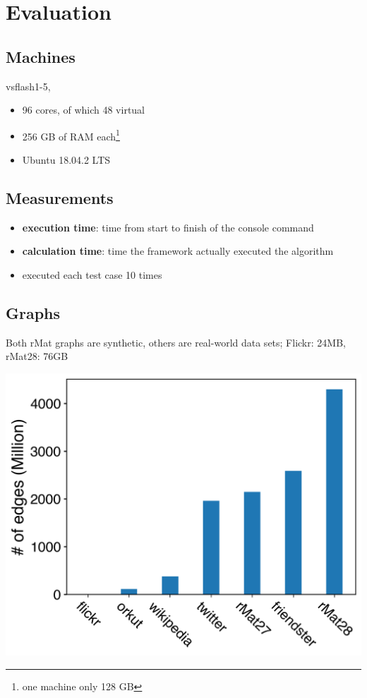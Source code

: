 \documentclass{meetings}
\begin{document}
\restoregeometry


\section{Evaluation}
\begin{multicols}{2}
\subsection*{Machines}
vsflash1-5, 
\begin{itemize}
	\item 96 cores, of which 48 virtual
	\item 256 GB of RAM each\footnote{\sffamily one machine only 128 GB}
	\item Ubuntu 18.04.2 LTS
\end{itemize}
\subsection*{Measurements}
\begin{itemize}
	\item \textbf{execution time}: time from start to finish of the console command
	\item \textbf{calculation time}: time the framework actually executed the algorithm
	\item executed each test case 10 times
\end{itemize}

\columnbreak

\subsection*{Graphs}
Both rMat graphs are synthetic, others are real-world data sets; Flickr: 24MB, rMat28: 76GB%
\begin{center}
	\includegraphics[width=\linewidth]{graphsize.png}
\end{center}
\end{multicols}
\end{document}
